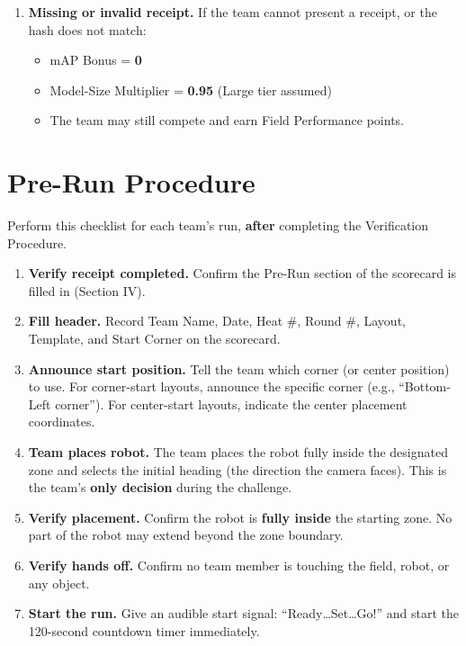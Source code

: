 \documentclass[a4]{article}
\begin{document}
\begin{enumerate}
    \item \textbf{Missing or invalid receipt.} If the team cannot present a receipt, or the hash does not match:
    \begin{itemize}
        \item mAP Bonus = \textbf{0}
        \item Model-Size Multiplier = \textbf{0.95} (Large tier assumed)
        \item The team may still compete and earn Field Performance points.
    \end{itemize}
\end{enumerate}

\pagebreak
\section*{Pre-Run Procedure}

Perform this checklist for each team's run, \textbf{after} completing the Verification Procedure.

\begin{enumerate}
    \item \textbf{Verify receipt completed.} Confirm the Pre-Run section of the scorecard is filled in (Section IV).

    \item \textbf{Fill header.} Record Team Name, Date, Heat \#, Round \#, Layout, Template, and Start Corner on the scorecard.

    \item \textbf{Announce start position.} Tell the team which corner (or center position) to use. For corner-start layouts, announce the specific corner (e.g., ``Bottom-Left corner''). For center-start layouts, indicate the center placement coordinates.

    \item \textbf{Team places robot.} The team places the robot fully inside the designated zone and selects the initial heading (the direction the camera faces). This is the team's \textbf{only decision} during the challenge.

    \item \textbf{Verify placement.} Confirm the robot is \textbf{fully inside} the starting zone. No part of the robot may extend beyond the zone boundary.

    \item \textbf{Verify hands off.} Confirm no team member is touching the field, robot, or any object.

    \item \textbf{Start the run.} Give an audible start signal: ``Ready\ldots Set\ldots Go!'' and start the 120-second countdown timer immediately.
\end{enumerate}
\end{document}
